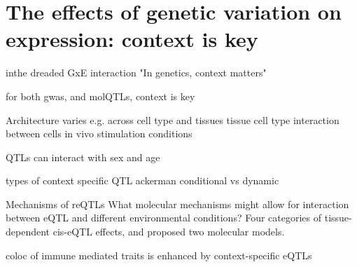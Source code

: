 \section{The effects of genetic variation on expression: context is key}

\begin{outline}

\1 inthe dreaded GxE interaction
    \2 "In genetics, context matters"

    \2 for both gwas, and molQTLs, context is key

\1 Architecture varies e.g. across cell type and tissues
    \2 tissue
    \2 cell type
    \2 interaction between cells in vivo
    \2 stimulation conditions

\1 QTLs can interact with sex and age

\1 types of context specific QTL
    \2 ackerman conditional vs dynamic

\1 Mechanisms of reQTLs
What molecular mechanisms might allow for interaction between \Gls{eQTL} and different environmental conditions?
Four categories of tissue-dependent cis-eQTL effects, and proposed two molecular models.



coloc of immune mediated traits is enhanced by context-specific eQTLs

\end{outline}


